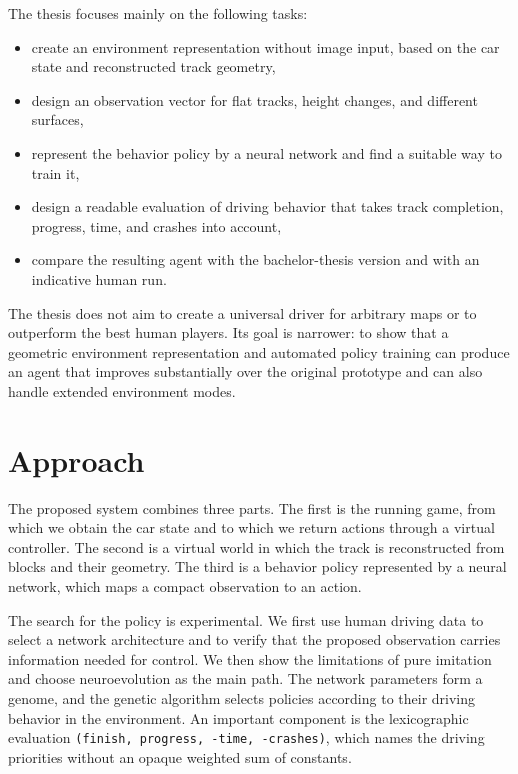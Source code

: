 The thesis focuses mainly on the following tasks:

\begin{itemize}
    \item create an environment representation without image input, based on the car state and reconstructed track geometry,
    \item design an observation vector for flat tracks, height changes, and different surfaces,
    \item represent the behavior policy by a neural network and find a suitable way to train it,
    \item design a readable evaluation of driving behavior that takes track completion, progress, time, and crashes into account,
    \item compare the resulting agent with the bachelor-thesis version and with an indicative human run.
\end{itemize}

The thesis does not aim to create a universal driver for arbitrary \Trackmania{} maps or to outperform the best human players. Its goal is narrower: to show that a geometric environment representation and automated policy training can produce an agent that improves substantially over the original prototype and can also handle extended environment modes.

\section*{Approach}

The proposed system combines three parts. The first is the running game, from which we obtain the car state and to which we return actions through a virtual controller. The second is a virtual world in which the track is reconstructed from blocks and their geometry. The third is a behavior policy represented by a neural network, which maps a compact observation to an action.

The search for the policy is experimental. We first use human driving data to select a network architecture and to verify that the proposed observation carries information needed for control. We then show the limitations of pure imitation and choose neuroevolution as the main path. The network parameters form a genome, and the genetic algorithm selects policies according to their driving behavior in the environment. An important component is the lexicographic evaluation \texttt{(finish, progress, -time, -crashes)}, which names the driving priorities without an opaque weighted sum of constants.

